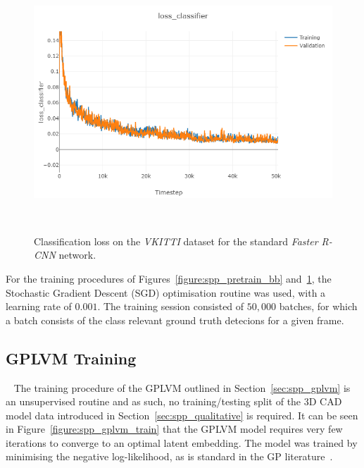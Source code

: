 \begin{figure}[!htbp]
  \centering
  \includegraphics[width=.8\linewidth]{figures/spp/quant/rcnn_pretrain/cls.png}
  \caption[VKITTI Classification Training]{Classification loss on the \textit{VKITTI} 
  dataset for the standard \textit{Faster R-CNN} network.}
~\label{figure:spp_pretrain_cls}
\end{figure}

For the training procedures of Figures~\ref{figure:spp_pretrain_bb} and~\ref{figure:spp_pretrain_cls}, the Stochastic Gradient 
Descent (SGD) optimisation routine was used, with a learning rate of \( 0.001 \). The training session consisted of \(50,000\) 
batches, for which a batch consists of the class relevant ground truth detecions for a given frame.

\subsection{GPLVM Training}
~\label{sec:spp_quantitative_gp_train}
The training procedure of the GPLVM outlined in Section~\ref{sec:spp_gplvm} is an unsupervised routine and as such, 
no training/testing split of the 3D CAD model data introduced in Section~\ref{sec:spp_qualitative} is required. It 
can be seen in Figure~\ref{figure:spp_gplvm_train} that the GPLVM model requires very few iterations to converge to 
an optimal latent embedding. The model was trained by minimising the negative log-likelihood, as is standard in 
the GP literature~\cite{GPML}.

